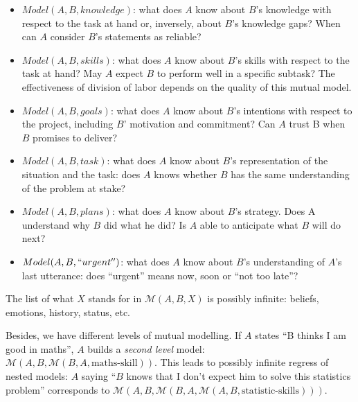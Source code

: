 \documentclass[natbib]{svjour3}
\newcommand{\M}[3]{{\mathcal{M}(#1, #2, #3)}}
\newcommand{\model}[3]{{$\mathcal{M}(#1, #2, #3)$}}
\begin{document}
\begin{itemize}

    \item $Model(A,B, knowledge)$: what does $A$ know about $B$'s knowledge with
        respect to the task at hand or, inversely, about $B$'s knowledge gaps?
        When can $A$ consider $B$'s statements as reliable? 

    \item $Model(A,B, skills)$: what does $A$ know about $B$'s skills with respect to
        the task at hand? May $A$ expect $B$ to perform well in a specific subtask?
        The effectiveness of division of labor depends on the quality of this
        mutual model. 

    \item $Model(A,B, goals)$: what does $A$ know about $B$'s intentions with respect
        to the project, including $B$' motivation and commitment? Can $A$ trust B
        when $B$ promises to deliver? 

    \item $Model(A,B, task)$: what does $A$ know about $B$'s representation of the
        situation and the task: does $A$ knows whether $B$ has the same
        understanding of the problem at stake? 

    \item $Model(A,B, plans)$: what does $A$ know about $B$'s strategy. Does A
        understand why $B$ did what he did? Is $A$ able to anticipate what $B$ will do
        next? 

    \item $Model(A,B, ``urgent'')$: what does $A$ know about $B$'s understanding of $A$'s
        last utterance: does ``urgent'' means now, soon or ``not too late''?

\end{itemize}

The list of what $X$ stands for in \model{A}{B}{X} is possibly infinite:
beliefs, emotions, history, status, etc.


Besides, we have different levels of mutual modelling. If $A$ states ``B thinks I am good in
maths'', $A$ builds a \emph{second level} model:
\model{A}{B}{\M{B}{A}{\text{maths-skill}}}. This leads to possibly infinite
regress of nested models: $A$
saying ``$B$ knows that I don't expect him to solve this statistics problem''
corresponds to \model{A}{B}{\M{B}{A}{\M{A}{B}{\text{statistic-skills}}}}.
\end{document}
